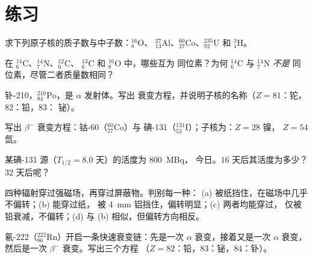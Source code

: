 \section{练习}

\begin{exercise}[$\star$]\label{exo:g11:nucleus-radioactivity:1}
求下列原子核的质子数与中子数：${}^{16}_{8}\mathrm{O}$、
${}^{27}_{13}\mathrm{Al}$、${}^{60}_{27}\mathrm{Co}$、${}^{235}_{92}\mathrm{U}$
和 ${}^{3}_{1}\mathrm{H}$。
\end{exercise}

\begin{exercise}[$\star$]\label{exo:g11:nucleus-radioactivity:2}
在 ${}^{14}_{6}\mathrm{C}$、${}^{14}_{7}\mathrm{N}$、${}^{12}_{6}\mathrm{C}$、
${}^{13}_{6}\mathrm{C}$ 和 ${}^{16}_{8}\mathrm{O}$ 中，哪些互为
同位素？为何 ${}^{14}_{6}\mathrm{C}$ 与 ${}^{14}_{7}\mathrm{N}$ \emph{不是}
同位素，尽管二者质量数相同？
\end{exercise}

\begin{exercise}[$\star$]\label{exo:g11:nucleus-radioactivity:3}
钋-210，${}^{210}_{84}\mathrm{Po}$，是 $\alpha$ 发射体。写出
衰变方程，并说明子核的名称（$Z = 81$：铊，$82$：铅，$83$：
铋）。
\end{exercise}

\begin{exercise}[$\star$]\label{exo:g11:nucleus-radioactivity:4}
写出 $\beta^-$ 衰变方程：钴-60（${}^{60}_{27}\mathrm{Co}$）与
碘-131（${}^{131}_{53}\mathrm{I}$）；子核为：$Z = 28$ 镍，
$Z = 54$ 氙。
\end{exercise}

\begin{exercise}[$\star$]\label{exo:g11:nucleus-radioactivity:5}
某碘-131 源（$T_{1/2} = 8.0$ 天）的活度为 \qty{800}{MBq}，
今日。$16$ 天后其活度为多少？$32$ 天后呢？
\end{exercise}

\begin{exercise}[$\star\star$]\label{exo:g11:nucleus-radioactivity:6}
四种辐射穿过强磁场，再穿过屏蔽物。判别每一种：
(a) 被纸挡住，在磁场中几乎不偏转；(b) 能穿过纸，
被 \qty{4}{mm} 铝挡住，偏转明显；(c) 两者均能穿过，
仅被铅衰减，不偏转；(d) 与 (b) 相似，但偏转方向相反。
\end{exercise}

\begin{exercise}[$\star\star$]\label{exo:g11:nucleus-radioactivity:7}
氡-222（${}^{222}_{86}\mathrm{Rn}$）开启一条快速衰变链：先是一次 $\alpha$
衰变，接着又是一次 $\alpha$ 衰变，然后是一次 $\beta^-$ 衰变。写出三个方程
（$Z = 82$：铅，$83$：铋，$84$：钋）。
\end{exercise}

